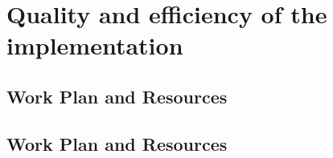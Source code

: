 \clearpage
\section{Quality and efficiency of the implementation}



\clearpage
\subsection{ Work Plan and Resources}

\clearpage
\subsection{ Work Plan and Resources}















































\endinput


% 
% 

% 
% 

% 

